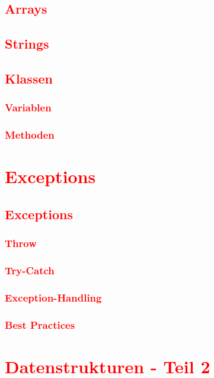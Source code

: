 \section{\textcolor{red}{Arrays}}\label{sec:arrays}
\section{\textcolor{red}{Strings}}\label{sec:strings}
\section{\textcolor{red}{Klassen}}\label{sec:classes}
\subsection{\textcolor{red}{Variablen}}\label{sec:class-variables}
\subsection{\textcolor{red}{Methoden}}\label{sec:class-methods}

\cleardoublepage\chapter{\textcolor{red}{Exceptions}}\label{chap:exceptions}
\section{\textcolor{red}{Exceptions}}\label{sec:exceptions}
\subsection{\textcolor{red}{Throw}}\label{sec:throw}
\subsection{\textcolor{red}{Try-Catch}}\label{sec:catch}
\subsection{\textcolor{red}{Exception-Handling}}\label{sec:exception-handling}
\subsection{\textcolor{red}{Best Practices}}\label{sec:best-practices}

\cleardoublepage\chapter{\textcolor{red}{Datenstrukturen - Teil 2}}\label{chap:datastructures-2}
